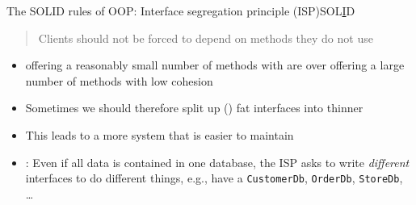 \begin{frame}{The SOLID rules of OOP: Interface segregation principle (ISP)}{SOL\underline  ID}
	\begin{quote}
		Clients should not be forced to depend on methods they do not use
	\end{quote}

	\bigskip
	\begin{itemize}[]
		\item<2->
		 offering a reasonably small number of methods with   are  over  offering a large number of methods with low cohesion
		\item<3->
		Sometimes we should therefore split up () fat interfaces into thinner 
		\item<3->
		This leads to a more  system that is easier to maintain
		\item<4-> : Even if all data is contained in one  database, the ISP asks to write \emph{different} interfaces to do different things, e.g., have a \texttt{CustomerDb}, \texttt{OrderDb}, \texttt{StoreDb}, \dots
	\end{itemize}
\end{frame}

